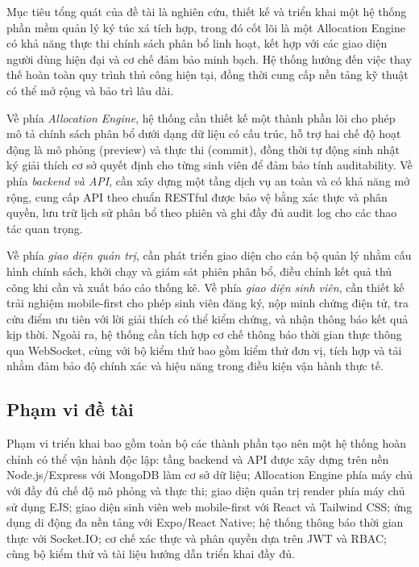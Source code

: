 ﻿\documentclass[a4paper,12pt,openany,oneside]{report}
\begin{document}
Mục tiêu tổng quát của đề tài là nghiên cứu, thiết kế và triển khai một hệ
thống phần mềm quản lý ký túc xá tích hợp, trong đó cốt lõi là một Allocation
Engine có khả năng thực thi chính sách phân bổ linh hoạt, kết hợp với các giao
diện người dùng hiện đại và cơ chế đảm bảo minh bạch. Hệ thống hướng đến việc
thay thế hoàn toàn quy trình thủ công hiện tại, đồng thời cung cấp nền tảng kỹ
thuật có thể mở rộng và bảo trì lâu dài.

Về phía \textit{Allocation Engine}, hệ thống cần thiết kế một thành phần lõi
cho phép mô tả chính sách phân bổ dưới dạng dữ liệu có cấu trúc, hỗ trợ hai
chế độ hoạt động là mô phỏng (preview) và thực thi (commit), đồng thời tự động
sinh nhật ký giải thích cơ sở quyết định cho từng sinh viên để đảm bảo tính
auditability. Về phía \textit{backend và API}, cần xây dựng một tầng dịch vụ
an toàn và có khả năng mở rộng, cung cấp API theo chuẩn RESTful được bảo vệ
bằng xác thực và phân quyền, lưu trữ lịch sử phân bổ theo phiên và ghi đầy đủ
audit log cho các thao tác quan trọng.

Về phía \textit{giao diện quản trị}, cần phát triển giao diện cho cán bộ quản
lý nhằm cấu hình chính sách, khởi chạy và giám sát phiên phân bổ, điều chỉnh
kết quả thủ công khi cần và xuất báo cáo thống kê. Về phía \textit{giao diện
sinh viên}, cần thiết kế trải nghiệm mobile-first cho phép sinh viên đăng ký,
nộp minh chứng điện tử, tra cứu điểm ưu tiên với lời giải thích có thể kiểm
chứng, và nhận thông báo kết quả kịp thời. Ngoài ra, hệ thống cần tích hợp cơ
chế thông báo thời gian thực thông qua WebSocket, cùng với bộ kiểm thử bao gồm
kiểm thử đơn vị, tích hợp và tải nhằm đảm bảo độ chính xác và hiệu năng trong
điều kiện vận hành thực tế.

\subsection{Phạm vi đề tài}

Phạm vi triển khai bao gồm toàn bộ các thành phần tạo nên một hệ thống hoàn
chỉnh có thể vận hành độc lập: tầng backend và API được xây dựng trên nền
Node.js/Express với MongoDB làm cơ sở dữ liệu; Allocation Engine phía máy chủ
với đầy đủ chế độ mô phỏng và thực thi; giao diện quản trị render phía máy chủ
sử dụng EJS; giao diện sinh viên web mobile-first với React và Tailwind CSS; ứng
dụng di động đa nền tảng với Expo/React Native; hệ thống thông báo thời gian
thực với Socket.IO; cơ chế xác thực và phân quyền dựa trên JWT và RBAC; cùng
bộ kiểm thử và tài liệu hướng dẫn triển khai đầy đủ.
\end{document}
